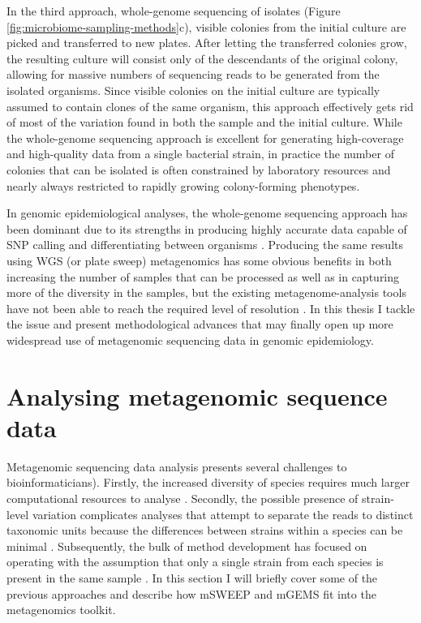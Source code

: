 \documentclass[officiallayout]{tktla}
\begin{document}
In the third approach, whole-genome sequencing of isolates (Figure
\ref{fig:microbiome-sampling-methods}c), visible colonies from the
initial culture are picked and transferred to new plates. After
letting the transferred colonies grow, the resulting culture will
consist only of the descendants of the original colony, allowing for
massive numbers of sequencing reads to be generated from the isolated
organisms. Since visible colonies on the initial culture are typically
assumed to contain clones of the same organism, this approach
effectively gets rid of most of the variation found in both the sample
and the initial culture. While the whole-genome sequencing approach is
excellent for generating high-coverage and high-quality data from a
single bacterial strain, in practice the number of colonies that can
be isolated is often constrained by laboratory resources and nearly
always restricted to rapidly growing colony-forming phenotypes.

In genomic epidemiological analyses, the whole-genome sequencing
approach has been dominant due to its strengths in producing highly
accurate data capable of SNP calling and differentiating between
organisms \citep{efsa2019whole}. Producing the same results using WGS
(or plate sweep) metagenomics has some obvious benefits in both
increasing the number of samples that can be processed as well as in
capturing more of the diversity in the samples, but the existing
metagenome-analysis tools have not been able to reach the required
level of resolution \citep{sczyrba2017critical,
  mcintyre2017comprehensive, maklin_bacterial_2021}. In this thesis I
tackle the issue and present methodological advances that may finally
open up more widespread use of metagenomic sequencing data in genomic
epidemiology.

\section{Analysing metagenomic sequence data}

Metagenomic sequencing data analysis presents several challenges to
bioinformaticians). Firstly, the increased diversity of species
requires much larger computational resources to analyse
\citep{yang2021review}. Secondly, the possible presence of
strain-level variation complicates analyses that attempt to separate
the reads to distinct taxonomic units because the differences between
strains within a species can be minimal
\citep{meyer2022critical}. Subsequently, the bulk of method
development has focused on operating with the assumption that only a
single strain from each species is present in the same sample
\citep{breitwieser2019review}. In this section I will briefly cover
some of the previous approaches and describe how mSWEEP and mGEMS fit
into the metagenomics toolkit.
\end{document}
